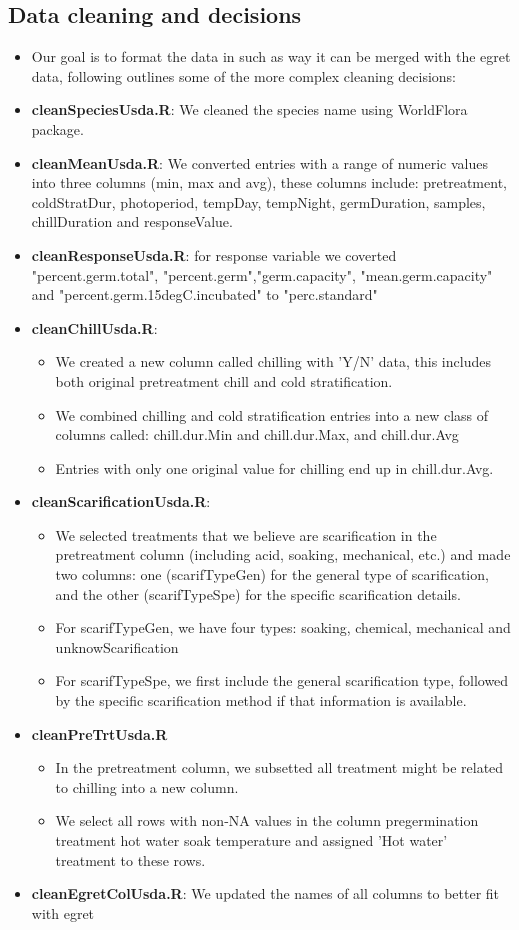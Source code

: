 \documentclass{article}[12pt]
\begin{document}
\subsection*{Data cleaning and decisions}
\begin{itemize}
\item Our goal is to format the data in such as way it can be merged with the egret data, following outlines some of the more complex cleaning decisions:
\item \textbf{cleanSpeciesUsda.R}: We cleaned the species name using WorldFlora package.
\item \textbf{cleanMeanUsda.R}: We converted entries with a range of numeric values into three columns (min, max and avg), these columns include:  pretreatment, coldStratDur, photoperiod, tempDay, tempNight, germDuration, samples, chillDuration and responseValue.
\item \textbf{cleanResponseUsda.R}: for response variable we coverted  "percent.germ.total", "percent.germ","germ.capacity",
"mean.germ.capacity" and "percent.germ.15degC.incubated" to "perc.standard"
\item \textbf{cleanChillUsda.R}:
\begin{itemize}
\item We created a new column called chilling with 'Y/N' data, this includes both original pretreatment chill and cold stratification.
\item We combined chilling and cold stratification entries into a new class of columns called: chill.dur.Min and chill.dur.Max, and chill.dur.Avg
\item Entries with only one original value for chilling end up in chill.dur.Avg. 
\end{itemize}
\item \textbf{cleanScarificationUsda.R}:
\begin{itemize}
\item We selected treatments that we believe are scarification in the pretreatment column (including acid, soaking, mechanical, etc.) and made two columns: one (scarifTypeGen) for the general type of scarification, and the other (scarifTypeSpe) for the specific scarification details.
\item For scarifTypeGen, we have four types: soaking, chemical, mechanical and unknowScarification
\item For scarifTypeSpe, we first include the general scarification type, followed by the specific scarification method if that information is available.
\end{itemize}
\item \textbf{cleanPreTrtUsda.R}
\begin{itemize}
\item In the pretreatment column, we subsetted all treatment might be related to chilling into a new column.
\item We select all rows with non-NA values in the column pregermination treatment hot water soak temperature and assigned 'Hot water' treatment to these rows.
\end{itemize}
\item \textbf{cleanEgretColUsda.R}: We updated the names of all columns to better fit with egret
\end{itemize}
\end{document}
